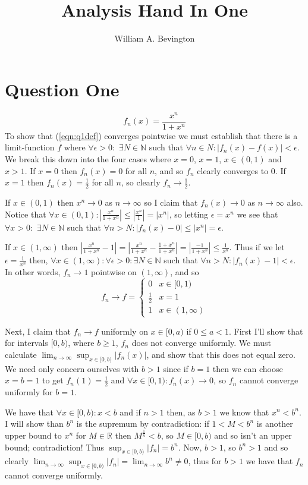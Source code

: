 \documentclass{article}
\author{William A. Bevington}
\title{Analysis Hand In One}
\date{}
\def \N {\mathbb{N}}
\def \R {\mathbb{R}}
\begin{document}
\maketitle

\section*{Question One}
	\begin{equation}\label{eqn:q1def}
	f_n(x) = \frac{x^n}{1+x^n}
	\end{equation}
To show that (\ref{eqn:q1def}) converges pointwise we must establish that there is a limit-function $f$ where $\forall\epsilon>0:$ $\exists N\in\N$ such that $\forall n\in N : |f_n(x)-f(x)|<\epsilon$. We break this down into the four cases where $x=0$, $x=1$, $x\in(0,1)$ and $x>1$. If $x=0$ then $f_n(x) = 0$ for all $n$, and so $f_n$ clearly converges to $0$. If $x=1$ then $f_n(x) = \frac12$ for all $n$, so clearly $f_n\to\frac12$.

If $x\in(0,1)$ then $x^n\to0$ as $n\to\infty$ so I claim that $f_n(x)\to0$ as $n\to\infty$ also. Notice that $\forall x\in(0,1): |\frac{x^n}{1+x^n}|\leq |\frac{x^{n}}{1}| = |x^n|$, so letting $\epsilon = x^n$ we see that $\forall x>0:$ $\exists N\in\N$ such that $\forall n>N: |f_n(x)-0|\leq |x^n|=\epsilon$.

If $x\in(1,\infty)$ then $|\frac{x^n}{1+x^n} - 1| = |\frac{x^n}{1+x^{n}} - \frac{1+x^n}{1+x^n}| = |\frac{-1}{1+x^n}| \leq \frac{1}{x^n}$. Thus if we let $\epsilon = \frac1{x^n}$ then, $\forall x\in(1,\infty):\forall\epsilon>0: \exists N\in\N$ such that $\forall n>N: |f_n(x) - 1| < \epsilon$. In other words, $f_n\to 1$ pointwise on $(1,\infty)$, and so
	\[
		f_n\to f =
		\begin{cases}
			0       & x\in[0,1) \\
			\frac12 & x = 1 \\
			1       & x\in(1,\infty)
		\end{cases}
	\]

Next, I claim that $f_n\to f$ uniformly on $x\in[0,a)$ if $0\leq a<1$. First I'll show that for intervals $[0,b)$, where $b\geq1$, $f_n$ does not converge uniformly. We must calculate $\lim_{n\to\infty}\sup_{x\in[0,b)}|f_n(x)|$, and show that this does not equal zero. We need only concern ourselves with $b>1$ since if $b=1$ then we can choose $x=b=1$ to get $f_n(1)=\frac12$ and $\forall x\in[0,1): f_n(x)\to0$, so $f_n$ cannot converge uniformly for $b=1$.

We have that $\forall x\in[0,b): x<b$ and if $n>1$ then, as $b>1$ we know that $x^n < b^n$. I will show than $b^n$ is the supremum by contradiction: if $1<M<b^n$ is another upper bound to $x^n$ for $M\in\R$ then $M^\frac1n < b$, so $M\in[0,b)$ and so isn't an upper bound; contradiction! Thus $\sup_{x\in[0,b)}|f_n| = b^n$. Now, $b>1$, so $b^n>1$ and so clearly $\lim_{n\to\infty}\sup_{x\in[0,b)}|f_n| = \lim_{n\to\infty}b^n \neq 0$, thus for $b>1$ we have that $f_n$ cannot converge uniformly.
\end{document}
